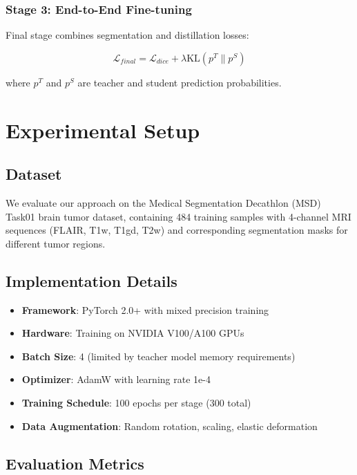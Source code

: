 \documentclass[conference]{IEEEtran}
\begin{document}
\subsubsection{Stage 3: End-to-End Fine-tuning}

Final stage combines segmentation and distillation losses:

\begin{equation}
\mathcal{L}_{final} = \mathcal{L}_{dice} + \lambda \text{KL}(p^T \| p^S)
\end{equation}

where $p^T$ and $p^S$ are teacher and student prediction probabilities.

\section{Experimental Setup}

\subsection{Dataset}

We evaluate our approach on the Medical Segmentation Decathlon (MSD) Task01 brain tumor dataset, containing 484 training samples with 4-channel MRI sequences (FLAIR, T1w, T1gd, T2w) and corresponding segmentation masks for different tumor regions.

\subsection{Implementation Details}

\begin{itemize}
    \item \textbf{Framework}: PyTorch 2.0+ with mixed precision training
    \item \textbf{Hardware}: Training on NVIDIA V100/A100 GPUs
    \item \textbf{Batch Size}: 4 (limited by teacher model memory requirements)
    \item \textbf{Optimizer}: AdamW with learning rate 1e-4
    \item \textbf{Training Schedule}: 100 epochs per stage (300 total)
    \item \textbf{Data Augmentation}: Random rotation, scaling, elastic deformation
\end{itemize}

\subsection{Evaluation Metrics}
\end{document}
